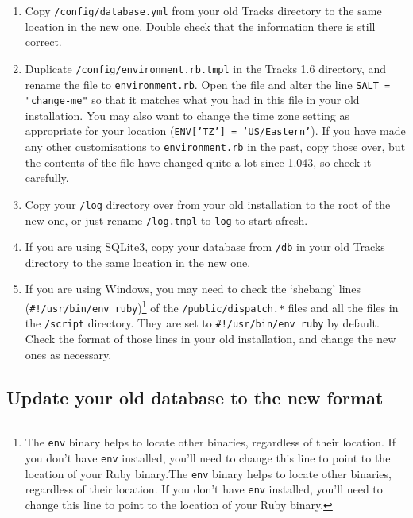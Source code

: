 \documentclass[10pt,twoside]{memoir}
\begin{document}
\begin{enumerate}


\item Copy \texttt{/config/database.yml} from your old Tracks directory to the same location in the new one. Double check that the information there is still correct.

\item Duplicate \texttt{/config/environment.rb.tmpl} in the Tracks 1.6 directory, and rename the file to \texttt{environment.rb}. Open the file and alter the line \texttt{SALT = "change-me"} so that it matches what you had in this file in your old installation. You may also want to change the time zone setting as appropriate for your location (\texttt{ENV['TZ'] = 'US/Eastern'}). If you have made any other customisations to \texttt{environment.rb} in the past, copy those over, but the contents of the file have changed quite a lot since 1.043, so check it carefully.

\item Copy your \texttt{/log} directory over from your old installation to the root of the new one, or just rename \texttt{/log.tmpl} to \texttt{log} to start afresh.

\item If you are using SQLite3, copy your database from \texttt{/db} in your old Tracks directory to the same location in the new one.

\item If you are using Windows, you may need to check the `shebang' lines (\texttt{\#!/usr/bin/env ruby})\footnote{The \texttt{env} binary helps to locate other binaries, regardless of their location. If you don't have \texttt{env} installed, you'll need to change this line to point to the location of your Ruby binary.The \texttt{env} binary helps to locate other binaries, regardless of their location. If you don't have \texttt{env} installed, you'll need to change this line to point to the location of your Ruby binary.} of the \texttt{/public/dispatch.*} files and all the files in the \texttt{/script} directory. They are set to \texttt{\#!/usr/bin/env ruby} by default. Check the format of those lines in your old installation, and change the new ones as necessary.
\end{enumerate}

\subsection{Update your old database to the new format}
\label{rake_upgrade}
\end{document}
